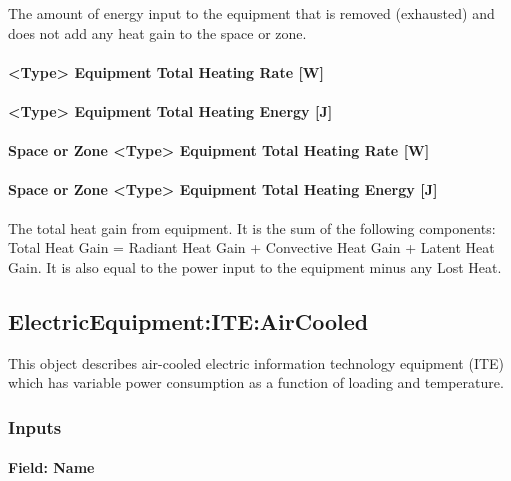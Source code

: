 The amount of energy input to the equipment that is removed (exhausted) and does not add any heat gain to the space or zone.

\paragraph{<Type> Equipment Total Heating Rate {[}W{]}}\label{equipment-total-heating-rate-w}

\paragraph{<Type> Equipment Total Heating Energy {[}J{]}}\label{equipment-total-heating-energy-j}

\paragraph{Space or Zone <Type> Equipment Total Heating Rate {[}W{]}}\label{zone-equipment-total-heating-rate-w}

\paragraph{Space or Zone <Type> Equipment Total Heating Energy {[}J{]}}\label{zone-equipment-total-heating-energy-j}

The total heat gain from equipment. It is the sum of the following components: Total Heat Gain = Radiant Heat Gain + Convective Heat Gain + Latent Heat Gain. It is also equal to the power input to the equipment minus any Lost Heat.


\subsection{ElectricEquipment:ITE:AirCooled}\label{electricequipmentiteaircooled}

This object describes air-cooled electric information technology equipment (ITE) which has variable power consumption as a function of loading and temperature.

\subsubsection{Inputs}\label{inputs-9-009}

\paragraph{Field: Name}\label{field-name-9-008}

